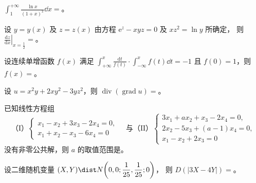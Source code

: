 \begin{question}[index=11]
$\displaystyle\int_1^{+\infty}\frac{\ln x}{(1+x)^2}\dd x=$\fillin。
\end{question}
\QuestionBreak

\begin{question}[index=12]
设 $y=y(x)$ 及 $z=z(x)$ 由方程 $\mathrm e^z-xyz=0$ 及 $xz^2=\ln y$ 所确定，
则 $\displaystyle\left.\frac{\mathrm dz}{\mathrm dx}\right|_{x=\frac12}=$\fillin。
\end{question}
\QuestionBreak

\begin{question}[index=13]
设连续单增函数 $f(x)$ 满足
$\displaystyle\int_{+\infty}^{x}\frac{\mathrm dt}{f(t)}\cdot\int_{-\infty}^{x} f(t)\dd t=-1$
且 $f(0)=1$，则 $f(x)=$\fillin。
\end{question}
\QuestionBreak

\begin{question}[index=14]
设 $u=x^2y+2xy^2-3yz^2$，则 $\operatorname{div}(\operatorname{grad}u)=$\fillin。
\end{question}
\QuestionBreak

\begin{question}[index=15]
已知线性方程组
\[
\text{（I）}\begin{cases}
x_1-x_2+3x_3-2x_4=0,\\
x_1+x_2-x_3-6x_4=0
\end{cases}
\quad\text{与（II）}\begin{cases}
3x_1+ax_2+x_3-2x_4=0,\\
2x_2-5x_3+(a-1)x_4=0,\\
x_1-x_2+2x_3=0
\end{cases}
\]
没有非零公共解，则 $a$ 的取值范围是\fillin。
\end{question}
\QuestionBreak

\begin{question}[index=16]
设二维随机变量 $(X,Y)\dist N\!\left(0,0;\dfrac{1}{25},\dfrac{1}{25};0\right)$，
则 $D(|3X-4Y|)=$\fillin。
\end{question}

